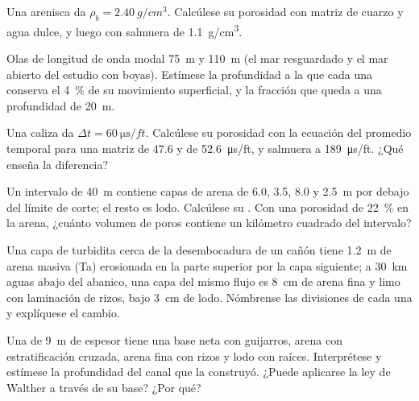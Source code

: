 \begin{exercise}[$\star$]\label{exo:b3:facies-models:3}
Una arenisca da $\rho_b = \qty{2.40}{g/cm^3}$. Calcúlese su porosidad con matriz de cuarzo y agua dulce,
y luego con salmuera de \qty{1.1}{g/cm^3}.
\end{exercise}

\begin{exercise}[$\star$]\label{exo:b3:facies-models:4}
Olas de longitud de onda modal \qty{75}{m} y \qty{110}{m} (el mar resguardado y el mar abierto del
estudio con boyas). Estímese la profundidad a la que cada una conserva el
\qty{4}{\percent} de su movimiento superficial, y la fracción que queda a una profundidad de
\qty{20}{m}.
\end{exercise}

\begin{exercise}[$\star\star$]\label{exo:b3:facies-models:5}
Una caliza da $\Delta t = \qty{60}{\micro\second/ft}$. Calcúlese su porosidad con la
ecuación del promedio temporal para una matriz de 47.6 y de
\qty{52.6}{\micro\second/ft}, y salmuera a \qty{189}{\micro\second/ft}. ¿Qué
enseña la diferencia?
\end{exercise}

\begin{exercise}[$\star\star$]\label{exo:b3:facies-models:6}
Un intervalo de \qty{40}{m} contiene capas de arena de 6.0, 3.5, 8.0 y \qty{2.5}{m}
por debajo del límite de corte; el resto es lodo. Calcúlese su . Con una
porosidad de \qty{22}{\percent} en la arena, ¿cuánto volumen de poros contiene un kilómetro
cuadrado del intervalo?
\end{exercise}

\begin{exercise}[$\star\star$]\label{exo:b3:facies-models:7}
Una capa de turbidita cerca de la desembocadura de un cañón tiene \qty{1.2}{m} de arena masiva
(Ta) erosionada en la parte superior por la capa siguiente; a \qty{30}{km} aguas abajo del abanico, una capa del
mismo flujo es \qty{8}{cm} de arena fina y limo con laminación de rizos, bajo \qty{3}{cm} de lodo.
Nómbrense las divisiones de cada una y explíquese el cambio.
\end{exercise}

\begin{exercise}[$\star\star$]\label{exo:b3:facies-models:8}
Una  de \qty{9}{m} de espesor tiene una base neta con guijarros,
arena con estratificación cruzada, arena fina con rizos y lodo con raíces. Interprétese y
estímese la profundidad del canal que la construyó. ¿Puede aplicarse la ley de Walther a través
de su base? ¿Por qué?
\end{exercise}

